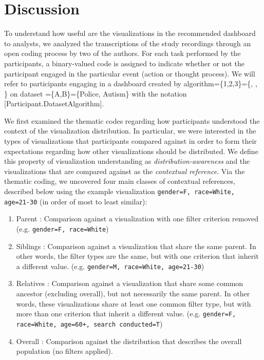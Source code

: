 \section{Discussion}
To understand how useful are the visualizations in the recommended dashboard to analysts, we analyzed the transcriptions of the study recordings through an open coding process by two of the authors. For each task performed by the participants, a binary-valued code is assigned to indicate whether or not the participant engaged in the particular event (action or thought process). We will refer to participants engaging in a dashboard created by algorithm=\{1,2,3\}=\{\system, \cluster, \BFS\} on dataset =\{A,B\}=\{Police, Autism\} with the notation [Participant.DatasetAlgorithm].

\par We first examined the thematic codes regarding how participants understood the context of the visualization distribution. In particular, we were interested in the types of visualizations that participants compared against in order to form their expectations regarding how other visualizations should be distributed. We define this property of visualization understanding as \textit{distribution-awareness} and the visualizations that are compared against as the \textit{contextual reference}. Via the thematic coding, we uncovered four main classes of contextual references, described below using the example visualization \texttt{gender=F, race=White, age=21-30} (in order of most to least similar):
\begin{enumerate}
	\item Parent : Comparison against a visualization with one filter criterion removed (e.g. \texttt{gender=F, race=White})
	\item Siblings : Comparison against a visualization that share the same parent. In other words, the filter types are the same, but with one criterion that inherit a different value. (e.g. \texttt{gender=M, race=White, age=21-30})
	\item Relatives : Comparison against a visualization that share some common ancestor (excluding overall), but not necessarily the same parent. In other words, these visualizations share at least one common filter type, but with more than one criterion that inherit a different value. (e.g. \texttt{gender=F, race=White, age=60+, search conducted=T})
	\item Overall : Comparison against the distribution that describes the overall population (no filters applied).
\end{enumerate}
